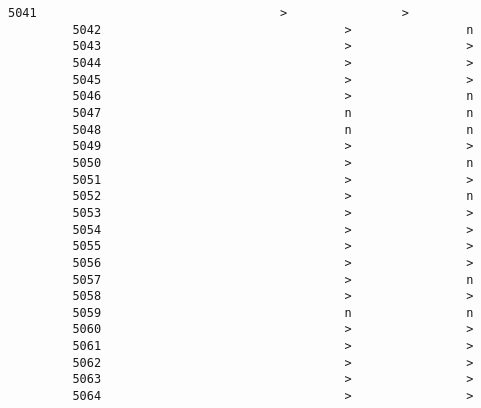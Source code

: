 \documentclass[11pt]{article}
\begin{document}
\begin{Verbatim}[commandchars=\\\{\}]
         5041                                  >                >   
         5042                                  >                n   
         5043                                  >                >   
         5044                                  >                >   
         5045                                  >                >   
         5046                                  >                n   
         5047                                  n                n   
         5048                                  n                n   
         5049                                  >                >   
         5050                                  >                n   
         5051                                  >                >   
         5052                                  >                n   
         5053                                  >                >   
         5054                                  >                >   
         5055                                  >                >   
         5056                                  >                >   
         5057                                  >                n   
         5058                                  >                >   
         5059                                  n                n   
         5060                                  >                >   
         5061                                  >                >   
         5062                                  >                >   
         5063                                  >                >   
         5064                                  >                >   
         

\end{Verbatim}
\end{document}
